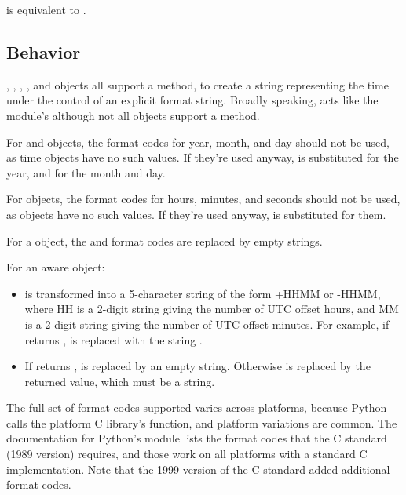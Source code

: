  is equivalent to .


\subsection{ Behavior}

, , , ,
and  objects all support a 
method, to create a string representing the time under the control of
an explicit format string.  Broadly speaking,
acts like the  module's
although not all objects support a  method.

For  and  objects, the format codes for
year, month, and day should not be used, as time objects have no such
values.  If they're used anyway,  is substituted for the
year, and  for the month and day.

For  objects, the format codes for hours, minutes, and
seconds should not be used, as  objects have no such
values.  If they're used anyway,  is substituted for them.

For a {\naive} object, the  and  format codes are
replaced by empty strings.

For an aware object:

\begin{itemize}
  \item[\code{\%z}]
     is transformed into a 5-character string of
    the form +HHMM or -HHMM, where HH is a 2-digit string giving the
    number of UTC offset hours, and MM is a 2-digit string giving the
    number of UTC offset minutes.  For example, if
     returns ,
     is replaced with the string .

  \item[\code{\%Z}]
    If  returns ,  is replaced
    by an empty string.  Otherwise  is replaced by the returned
    value, which must be a string.
\end{itemize}

The full set of format codes supported varies across platforms,
because Python calls the platform C library's 
function, and platform variations are common.  The documentation for
Python's  module lists the format codes that the C
standard (1989 version) requires, and those work on all platforms
with a standard C implementation.  Note that the 1999 version of the
C standard added additional format codes.

